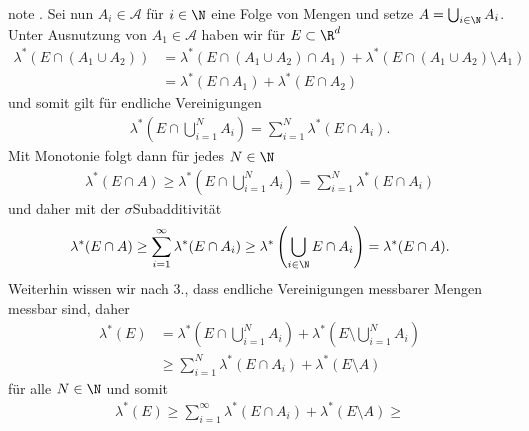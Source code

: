 \documentclass[letterpaper,10pt,english]{jupyterBook}
\begin{document}
\begin{sphinxadmonition}{note}
. Sei nun \(A_i\in\mathcal{A}\) für \(i\in\N\) eine  Folge von Mengen und setze \(A=\bigcup_{i\in\N} A_i\). Unter Ausnutzung von \(A_1\in\mathcal{A}\) haben wir für \(E\subset\R^d\)
\begin{equation*}
\begin{split}\lambda^\ast(E\cap (A_1\cup A_2)) &= \lambda^\ast(E\cap(A_1\cup A_2)\cap A_1) + \lambda^\ast(E\cap(A_1\cup A_2)\setminus A_1)\\
&=
\lambda^\ast(E\cap A_1) + \lambda^\ast(E\cap A_2)\end{split}
\end{equation*}
\sphinxAtStartPar
und somit gilt für endliche Vereinigungen
\begin{equation*}
\begin{split}\lambda^\ast(E\cap \bigcup_{i=1}^N A_i) = \sum_{i=1}^N \lambda^\ast(E\cap A_i).\end{split}
\end{equation*}
\sphinxAtStartPar
Mit Monotonie folgt dann für jedes \(N\in\N\)
\begin{equation*}
\begin{split}\lambda^\ast(E\cap A)\geq \lambda^\ast(E\cap \bigcup_{i=1}^N A_i) = \sum_{i=1}^N \lambda^\ast(E\cap A_i)\end{split}
\end{equation*}
\sphinxAtStartPar
und daher mit der \(\sigma\)\sphinxhyphen{}Subadditivität
\begin{equation}\label{equation:masstheorie/masstheorie:eq:LebesgueAlgebra}
\begin{split}\lambda^\ast(E\cap A) \geq \sum_{i=1}^\infty \lambda^\ast(E\cap A_i)\geq \lambda^\ast\left(\bigcup_{i\in\N} E\cap A_i\right) = \lambda^\ast(E\cap A).\end{split}
\end{equation}
\sphinxAtStartPar
Weiterhin wissen wir nach 3., dass endliche Vereinigungen messbarer Mengen messbar sind, daher
\begin{equation*}
\begin{split}\lambda^\ast(E) &= \lambda^\ast\left(E\cap \bigcup_{i=1}^N A_i\right) + \lambda^\ast\left(E\setminus \bigcup_{i=1}^N A_i\right)\\
&\geq
\sum_{i=1}^N \lambda^\ast(E\cap A_i) + \lambda^\ast(E\setminus A)\end{split}
\end{equation*}
\sphinxAtStartPar
für alle \(N\in\N\) und somit
\begin{equation*}
\begin{split}\lambda^\ast(E)\geq \sum_{i=1}^\infty \lambda^\ast(E\cap A_i) + \lambda^\ast(E\setminus A)\geq 

\end{split}
\end{equation*}
\end{sphinxadmonition}
\end{document}
